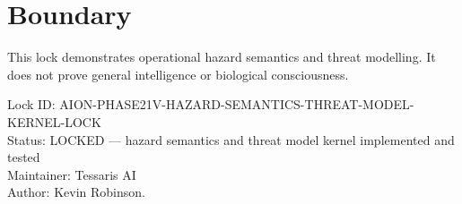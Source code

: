 \documentclass[11pt,a4paper]{article}
\begin{document}
\section{Boundary}

This lock demonstrates operational hazard semantics and threat modelling. It does not prove general intelligence or biological consciousness.

\bigskip

\noindent
Lock ID: AION-PHASE21V-HAZARD-SEMANTICS-THREAT-MODEL-KERNEL-LOCK\\
Status: LOCKED --- hazard semantics and threat model kernel implemented and tested\\
Maintainer: Tessaris AI\\
Author: Kevin Robinson.
\end{document}
